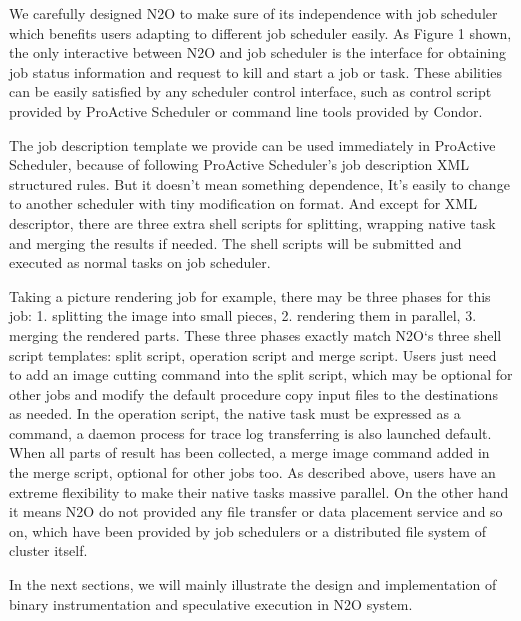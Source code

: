 We carefully designed N2O to make sure of its independence with job scheduler which benefits users adapting to different job scheduler easily. As Figure 1 shown, the only interactive between N2O and job scheduler is the interface for obtaining job status information and request to kill and start a job or task. These abilities can be easily satisfied by any scheduler control interface, such as control script provided by ProActive Scheduler or command line tools provided by Condor.

The job description template we provide can be used immediately in ProActive Scheduler, because of following ProActive Scheduler’s job description XML structured rules. But it doesn't mean something dependence, It’s easily to change to another scheduler with tiny modification on format. And except for XML descriptor, there are three extra shell scripts for splitting, wrapping native task and merging the results if needed. The shell scripts will be submitted and executed as normal tasks on job scheduler.

Taking a picture rendering job for example, there may be three phases for this job: 1. splitting the image into small pieces, 2. rendering them in parallel, 3. merging the rendered parts. These three phases exactly match N2O‘s three shell script templates: split script, operation script and merge script. Users just need to add an image cutting command into the split script, which may be optional for other jobs and modify the default procedure copy input files to the destinations as needed. In the operation script, the native task must be  expressed as a command, a daemon process for trace log transferring is also launched default. When all parts of result has been collected, a merge image command added in the merge script, optional for other jobs too. As described above,  users have an extreme flexibility to make their native tasks massive parallel. On the other hand it means N2O do not provided any file transfer or data placement service and so on, which have been provided by job schedulers or a distributed file system of cluster itself.

In the next sections, we will mainly illustrate the design and implementation of binary instrumentation and speculative execution in N2O system. 